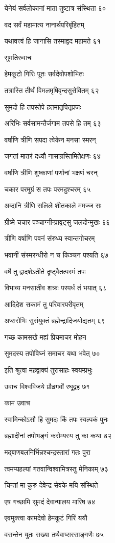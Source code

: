 येनेयं सर्वलोकानां माता तुष्टात्र संस्थिता ६०

वद सर्वं महामात्य नानार्थपरिबृंहितम्

यथावत्त्वं हि जानासि तस्माद्वद महामते ६१

सुमतिरुवाच

हेमकूटो गिरिः पूतः सर्वदेवोपशोभितः

तत्रास्ति तीर्थं विमलमृषिवृन्दसुसेवितम् ६२

सुमदो हि तपस्तेपे हतमातृपितृप्रजः

अरिभिः सर्वसामन्तैर्जगाम तपसे हि तम् ६३

वर्षाणि त्रीणि सपदा त्वेकेन मनसा स्मरन्

जगतां मातरं दध्यौ नासाग्रस्तिमितेक्षणः ६४

वर्षाणि त्रीणि शुष्काणां पर्णानां भक्षणं चरन्

चकार परमुग्रं स तपः परमदुश्चरम् ६५

अब्दानि त्रीणि सलिले शीतकाले ममज्ज सः

ग्रीष्मे चचार पञ्चाग्नीन्प्रावृट्सु जलदोन्मुखः ६६

त्रीणि वर्षाणि पवनं संरुध्य स्वान्तगोचरम्

भवानीं संस्मरन्धीरो न च किञ्चन पश्यति ६७

वर्षे तु द्वादशेऽतीते दृष्ट्वैतत्परमं तपः

विभाव्य मनसातीव शक्रः पस्पर्ध तं भयात् ६८

आदिदेश सकामं तु परिवारपरीवृतम्

अप्सरोभिः सुसंयुक्तं ब्रह्मेन्द्रादिजयोद्यतम् ६९

गच्छ कामसखे मह्यं प्रियमाचर मोहन

सुमदस्य तपोविघ्नं समाचर यथा भवेत् ७०

इति श्रुत्वा महद्वाक्यं तुरासाहः स्वयम्प्रभुः

उवाच विश्वविजये प्रौढगर्वो रघूद्वह ७१

काम उवाच

स्वामिन्कोऽसौ हि सुमदः किं तपः स्वल्पकं पुनः

ब्रह्मादीनां तपोभङ्गं करोम्यस्य तु का कथा ७२

मद्बाणबलनिर्भिन्नश्चन्द्रस्तारां गतः पुरा

त्वमप्यहल्यां गतवान्विश्वामित्रस्तु मेनिकाम् ७३

चिन्तां मा कुरु देवेन्द्र सेवके मयि संस्थिते

एष गच्छामि सुमदं देवान्पालय मारिष ७४

एवमुक्त्वा कामदेवो हेमकूटं गिरिं ययौ

वसन्तेन युतः सख्या तथैवाप्सरसाङ्गणैः ७५

